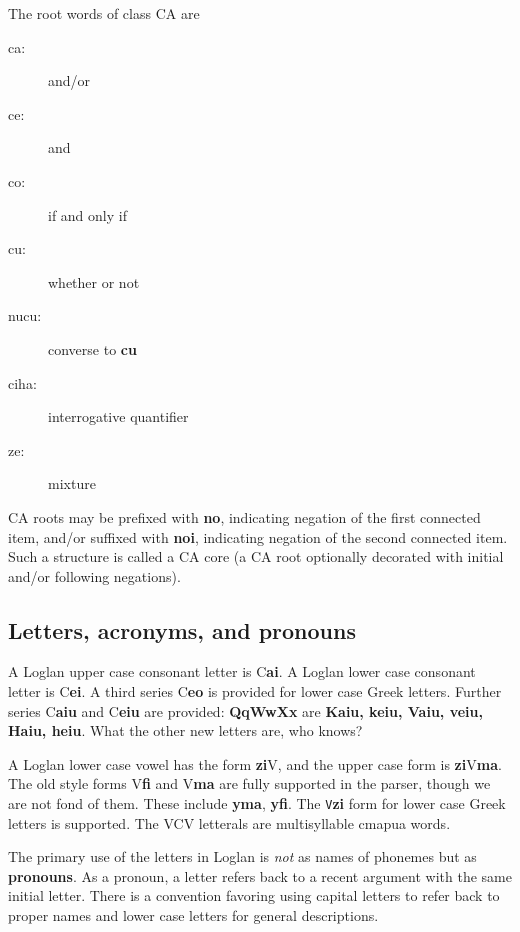 \documentclass[12pt]{book}
\begin{document}
The root words of class CA are

\begin{description}

\item[ca:]  and/or

\item[ce:] and

\item[co:] if and only if

\item[cu:] whether or not

\item[nucu:]  converse to {\bf cu}

\item[ciha:] interrogative quantifier

\item[ze:]  mixture

\end{description}

CA roots may be prefixed with {\bf no}, indicating negation of the first connected item,  and/or suffixed with {\bf noi}, indicating negation of the second connected item.
Such a structure is called a CA core (a CA root optionally decorated with initial and/or following negations).

\subsection{Letters, acronyms, and pronouns}

A Loglan upper case consonant letter is C{\bf ai}.   A Loglan lower case consonant letter is C{\bf ei}.   A third series C{\bf eo} is provided for lower case Greek letters.
Further series C{\bf aiu} and C{\bf eiu} are provided:  {\bf QqWwXx} are {\bf Kaiu, keiu, Vaiu, veiu, Haiu, heiu}.  What the other new letters are, who knows?

A Loglan lower case vowel has the form {\bf zi}V, and the upper case form is {\bf zi}V{\bf ma}.  The old style forms V{\bf fi} and V{\bf ma} are fully supported in the parser, though we are not fond of them.  These include {\bf yma}, {\bf yfi}.  The {\tt V}{\bf zi} form for lower case Greek letters is supported.   The VCV letterals are multisyllable cmapua words.

The primary use of the letters in Loglan is {\em not\/} as names of phonemes but as {\bf pronouns}.  As a pronoun, a letter refers back to a recent argument with the
same initial letter.   There is a convention favoring using capital letters to refer back to proper names and lower case letters for general descriptions.
\end{document}
